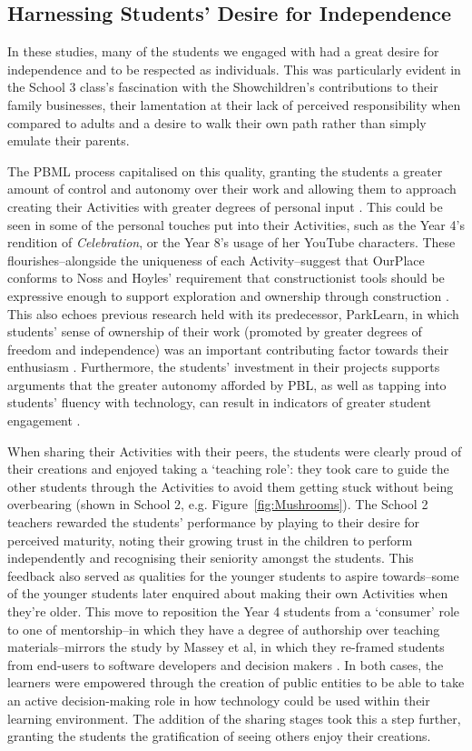\documentclass[,hyphens]{sigchi}
\begin{document}
\subsection{Harnessing Students' Desire for Independence}
In these studies, many of the students we engaged with had a great desire for independence and to be respected as individuals. This was particularly evident in the School 3 class's fascination with the Showchildren's contributions to their family businesses, their lamentation at their lack of perceived responsibility when compared to adults and a desire to walk their own path rather than simply emulate their parents.

The PBML process capitalised on this quality, granting the students a greater amount of control and autonomy over their work \cite{Noss2017, Wurdinger2007} and allowing them to approach creating their Activities with greater degrees of personal input \cite{Richardson2017}. This could be seen in some of the personal touches put into their Activities, such as the Year 4's rendition of \textit{Celebration}, or the Year 8's usage of her YouTube characters. These flourishes--alongside the uniqueness of each Activity--suggest that OurPlace conforms to Noss and Hoyles' requirement that constructionist tools should be expressive enough to support exploration and ownership through construction \cite{Noss2017}. This also echoes previous research held with its predecessor, ParkLearn, in which students' sense of ownership of their work (promoted by greater degrees of freedom and independence) was an important contributing factor towards their enthusiasm \cite{Richardson2018}. Furthermore, the students' investment in their projects supports arguments that the greater autonomy afforded by PBL, as well as tapping into students' fluency with technology, can result in indicators of greater student engagement \cite{Wurdinger2007, Bell2010}.

When sharing their Activities with their peers, the students were clearly proud of their creations and enjoyed taking a `teaching role': they took care to guide the other students through the Activities to avoid them getting stuck without being overbearing (shown in School 2, e.g. Figure~\ref{fig:Mushrooms}). The School 2 teachers rewarded the students' performance by playing to their desire for perceived maturity, noting their growing trust in the children to perform independently and recognising their seniority amongst the students. This feedback also served as qualities for the younger students to aspire towards--some of the younger students later enquired about making their own Activities when they're older. This move to reposition the Year 4 students from a `consumer' role to one of mentorship--in which they have a degree of authorship over teaching materials--mirrors the study by Massey et al, in which they re-framed students from end-users to software developers and decision makers \cite{Massey2006}. In both cases, the learners were empowered through the creation of public entities to be able to take an active decision-making role in how technology could be used within their learning environment. The addition of the sharing stages took this a step further, granting the students the gratification of seeing others enjoy their creations.
 
\end{document}
